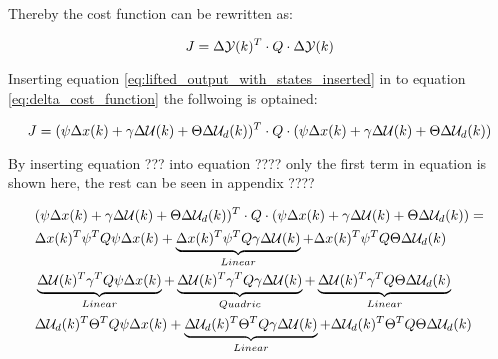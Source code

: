 Thereby the cost function can be rewritten as:

\begin{equation}\label{eq:delta_cost_function}
	J = \Delta\CMcal{Y}(k)^T \cdot Q \cdot \Delta\CMcal{Y}(k)
\end{equation}

Inserting equation \ref{eq:lifted_output_with_states_inserted} in to equation \ref{eq:delta_cost_function} the follwoing is optained:

\begin{equation}
	J = (\psi\Delta x(k) + \gamma\Delta \CMcal{U}(k) + \Theta\Delta \CMcal{U}_d(k))^T\cdot Q \cdot (\psi\Delta x(k) + \gamma\Delta \CMcal{U}(k) + \Theta\Delta \CMcal{U}_d(k))
\end{equation}



By inserting equation ??? into equation ???? only the first term in equation is shown here, the rest can be seen in appendix ????

\begin{equation}
	\begin{aligned}
	&(\psi\Delta x(k) + \gamma\Delta \CMcal{U}(k) + \Theta\Delta \CMcal{U}_d(k))^T\cdot Q \cdot (\psi\Delta x(k) + \gamma\Delta \CMcal{U}(k) + \Theta\Delta \CMcal{U}_d(k)) = \\
	& \Delta x(k)^T\psi ^T Q \psi \Delta x(k) 								+ \underbrace{\Delta x(k)^T \psi ^T Q \gamma \Delta  \CMcal{U}(k) }_{Linear}				+\Delta x(k)^T \psi ^T Q \Theta \Delta \CMcal{U}_d(k) \\
	& \underbrace{\Delta \CMcal{U}(k)^T \gamma ^T Q \psi\Delta x(k)}_{Linear} + \underbrace{\Delta \CMcal{U}(k)^T\gamma ^T Q \gamma\Delta \CMcal{U}(k)}_{Quadric} +\underbrace{\Delta \CMcal{U}(k)^T \gamma ^T Q\Theta \Delta \CMcal{U}_d(k)}_{Linear} \\ 
	& \Delta \CMcal{U}_d(k)^T \Theta ^T Q  \psi \Delta x(k)					+ \underbrace{\Delta \CMcal{U}_d(k)^T \Theta ^T Q \gamma  \Delta \CMcal{U}(k) }_{Linear}	+\Delta \CMcal{U}_d(k)^T \Theta ^T Q \Theta \Delta \CMcal{U}_d(k)
	\end{aligned}
\end{equation}



